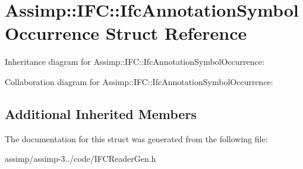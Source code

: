 \hypertarget{struct_assimp_1_1_i_f_c_1_1_ifc_annotation_symbol_occurrence}{\section{Assimp\+:\+:I\+F\+C\+:\+:Ifc\+Annotation\+Symbol\+Occurrence Struct Reference}
\label{struct_assimp_1_1_i_f_c_1_1_ifc_annotation_symbol_occurrence}
}


Inheritance diagram for Assimp\+:\+:I\+F\+C\+:\+:Ifc\+Annotation\+Symbol\+Occurrence\+:


Collaboration diagram for Assimp\+:\+:I\+F\+C\+:\+:Ifc\+Annotation\+Symbol\+Occurrence\+:
\subsection*{Additional Inherited Members}


The documentation for this struct was generated from the following file\+:\begin{DoxyCompactItemize}
\item 
assimp/assimp-\/3../code/I\+F\+C\+Reader\+Gen.\+h\end{DoxyCompactItemize}
